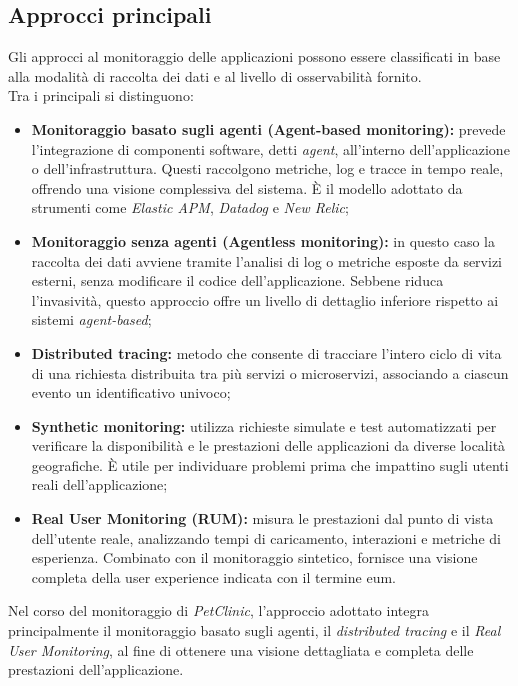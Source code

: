 \subsection{Approcci principali}
Gli approcci al monitoraggio delle applicazioni possono essere classificati in base alla modalità di raccolta dei dati e al livello di osservabilità fornito. \\
Tra i principali si distinguono:
\begin{itemize}
\item \textbf{Monitoraggio basato sugli agenti (Agent-based monitoring):} prevede l'integrazione di componenti software, detti \emph{agent}, all'interno dell'applicazione o dell'infrastruttura. Questi raccolgono metriche, log e tracce in tempo reale, offrendo una visione complessiva del sistema. È il modello adottato da strumenti come \emph{Elastic APM}, \emph{Datadog} e \emph{New Relic};

\item \textbf{Monitoraggio senza agenti (Agentless monitoring):} in questo caso la raccolta dei dati avviene tramite l'analisi di log o metriche esposte da servizi esterni, senza modificare il codice dell'applicazione. Sebbene riduca l'invasività, questo approccio offre un livello di dettaglio inferiore rispetto ai sistemi \emph{agent-based};

\item \textbf{Distributed tracing:} metodo che consente di tracciare l'intero ciclo di vita di una richiesta distribuita tra più servizi o microservizi, associando a ciascun evento un identificativo univoco;

\item \textbf{Synthetic monitoring:} utilizza richieste simulate e test automatizzati per verificare la disponibilità e le prestazioni delle applicazioni da diverse località geografiche. È utile per individuare problemi prima che impattino sugli utenti reali dell'applicazione;

\item \textbf{Real User Monitoring (RUM):} misura le prestazioni dal punto di vista dell'utente reale, analizzando tempi di caricamento, interazioni e metriche di esperienza. Combinato con il monitoraggio sintetico, fornisce una visione completa della user experience indicata con il termine \gls{eum}\glsfirstoccur.
\end{itemize}
Nel corso del monitoraggio di \emph{PetClinic}, l'approccio adottato integra principalmente il monitoraggio basato sugli agenti, il \emph{distributed tracing} e il \emph{Real User Monitoring}, al fine di ottenere una visione dettagliata e completa delle prestazioni dell'applicazione.


